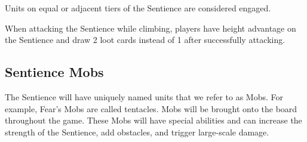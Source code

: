\documentclass[../main.tex]{subfiles}
\begin{document}
Units on equal or adjacent tiers of the Sentience are considered engaged.

When attacking the Sentience while climbing, players have height advantage on the Sentience and draw 2 loot cards instead of 1 after successfully attacking.

\subsection{Sentience Mobs}

The Sentience will have uniquely named units that we refer to as Mobs. For example, Fear’s Mobs are called tentacles. Mobs will be brought onto the board throughout the game. These Mobs will have special abilities and can increase the strength of the Sentience, add obstacles, and trigger large-scale damage.

\clearpage
\end{document}

